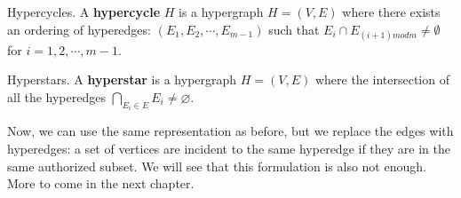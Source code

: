 \begin{definition}{Hypercycles.}
    A \textbf{hypercycle} $H$ is a hypergraph $H = (V,E)$ where there exists an ordering of hyperedges: $(E_1, E_2, \cdots, E_{m-1})$ such that $E_{i} \cap E_{(i+1) m o d m} \neq \emptyset$ for $i = 1,2,\cdots,m-1$.
\end{definition}

\begin{definition}{Hyperstars.}
    A \textbf{hyperstar} is a hypergraph $H = (V,E)$ where the intersection of all the hyperedges $\bigcap_{E_{i} \in E} E_{i} \neq \varnothing$.
\end{definition}

Now, we can use the same representation as before, but we replace the edges with hyperedges: a set of vertices are incident to the same hyperedge if they are in the same authorized subset. We will see that this formulation is also not enough. More to come in the next chapter.